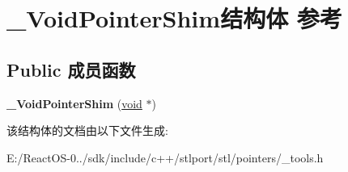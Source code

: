 \hypertarget{struct___void_pointer_shim}{}\section{\+\_\+\+Void\+Pointer\+Shim结构体 参考}
\label{struct___void_pointer_shim}
\subsection*{Public 成员函数}
\begin{DoxyCompactItemize}
\item 
\mbox{\label{struct___void_pointer_shim_a835f41197bbd999c9d78ba8d29e544da}} 
{\bfseries \+\_\+\+Void\+Pointer\+Shim} (\hyperlink{interfacevoid}{void} $\ast$)
\end{DoxyCompactItemize}


该结构体的文档由以下文件生成\+:\begin{DoxyCompactItemize}
\item 
E\+:/\+React\+O\+S-\/0../sdk/include/c++/stlport/stl/pointers/\+\_\+tools.\+h\end{DoxyCompactItemize}
